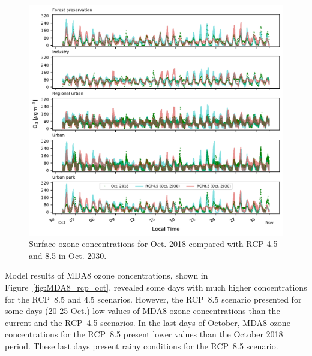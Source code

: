 \begin{figure}[!hbt]
  \includegraphics[width=1\textwidth]{fig/rcp_2030_oct_subplot_o3}
  \caption{Surface ozone concentrations for Oct. 2018 compared with RCP 4.5 and 8.5 in Oct. 2030.}
  \label{fig:o3_rcp_oct}
\end{figure}

Model results of MDA8 ozone concentrations, shown in Figure~\ref{fig:MDA8_rcp_oct}, revealed some days with much higher concentrations for the RCP~8.5 and 4.5 scenarios.
However, the RCP~8.5 scenario presented for some days (20-25 Oct.) low values of MDA8 ozone concentrations than the current and the RCP~4.5 scenarios.
In the last days of October, MDA8 ozone concentrations for the RCP~8.5 present lower values than the October 2018 period.
These last days present rainy conditions for the RCP~8.5 scenario. 

